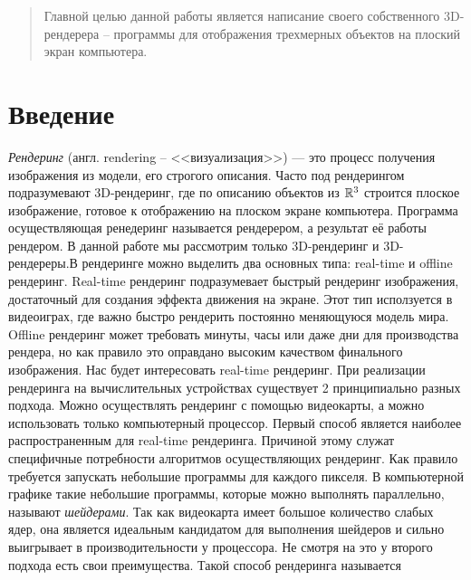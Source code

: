 \documentclass{article}
\begin{document}
\makeTitlePage

\tableofcontents

\begin{abstract}
    Главной целью данной работы является написание своего 
    собственного 3D-рендерера -- программы для отображения трехмерных объектов на плоский 
    экран компьютера.
\end{abstract}


\section{Введение}

\emph{Рендеринг} (англ. rendering -- <<визуализация>>) --- это процесс 
получения изображения из модели, его строгого описания. 
Часто под рендерингом подразумевают 3D-рендеринг, где по 
описанию объектов из $\mathbb{R}^3$ строится плоское изображение,  
готовое к отображению на плоском экране компьютера. Программа 
осуществляющая ренедеринг называется рендерером, а результат её работы 
рендером. В данной работе мы рассмотрим только 3D-рендеринг и 
3D-рендереры.В рендеринге можно выделить два основных 
типа: real-time и offline рендеринг. Real-time рендеринг подразумевает 
быстрый рендеринг изображения, достаточный для создания эффекта движения на 
экране. Этот тип исползуется в видеоиграх, где важно быстро 
рендерить постоянно меняющуюся модель мира. Offline рендеринг 
может требовать минуты, часы или даже дни для производства рендера, 
но как правило это оправдано высоким качеством финального изображения. Нас будет интересовать 
real-time рендеринг. При реализации рендеринга на вычислительных 
устройствах существует 2 принципиально разных подхода. Можно 
осуществлять рендеринг с помощью видеокарты, а можно использовать 
только компьютерный процессор. Первый способ является наиболее 
распространенным для real-time рендеринга.
Причиной этому служат специфичные потребности алгоритмов осуществляющих рендеринг.
Как правило требуется запускать небольшие программы для каждого 
пикселя. В компьютерной графике такие небольшие программы, которые 
можно выполнять параллельно, называют \emph{шейдерами}. Так как 
видеокарта имеет большое количество слабых ядер, она является 
идеальным кандидатом для выполнения шейдеров и сильно выигрывает 
в производительности у процессора. Не смотря на это у второго 
подхода есть свои преимущества. Такой способ рендеринга называется
\end{document}
